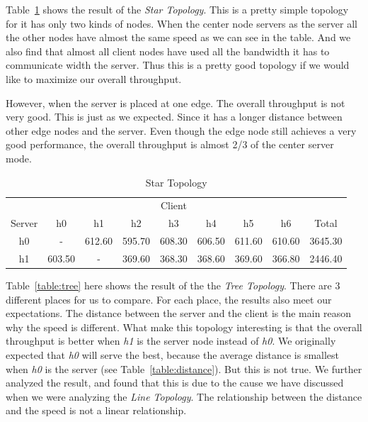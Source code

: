 Table~\ref{table:star} shows the result of the {\it Star Topology}. This is a pretty
simple topology for it has only two kinds of nodes. When the center node servers as the server 
all the other nodes have almost the same speed as we can see in the table. And we also find that 
almost all client nodes have used all the bandwidth it has to communicate width the server.
Thus this is a pretty good topology if we would like to maximize our overall throughput.

However, when the server is placed at one edge. The overall throughput is not very good. This is just as
we expected. Since it has a longer distance between other edge nodes and the server. Even though 
the edge node still achieves a very good performance, the overall throughput is almost 2/3 of the
center server mode.

\begin{table}
	\renewcommand{\arraystretch}{1.3}
	\caption{Star Topology}
	\label{table:star}
	\setlength\tabcolsep{4pt}
	\centering
	\begin{tabular}{|c||c|c|c|c|c|c|c||c|}
		\hline
		       & \multicolumn{7}{c||}{Client} &  \\ \hhline{|~||-------||~|}
		Server & h0 & h1 & h2 & h3 & h4 & h5 & h6 & Total\\
\hline\hline
h0 &     -    &  612.60  &  595.70  &  608.30  &  606.50  &  611.60  &  610.60  & 3645.30 \\
\hline
h1 &  603.50  &    -     &  369.60  &  368.30  &  368.60  &  369.60  &  366.80  & 2446.40 \\
\hline
	\end{tabular}
\end{table}

Table~\ref{table:tree} here shows the result of the the {\it Tree Topology}. There are 3
different places for us to compare. For each place, the results also meet our expectations.
The distance between the server and the client is the main reason why the speed is different.
What make this topology interesting is that the overall throughput is better when {\it h1} is the 
server node instead of {\it h0}. We originally expected that {\it h0} will serve the best, because the 
average distance is smallest when {\it h0} is the server (see Table~\ref{table:distance}). 
But this is not true. We further analyzed
the result, and found that this is due to the cause we have discussed when we were analyzing
the {\it Line Topology}. The relationship between the distance and the speed is not a linear
relationship.

